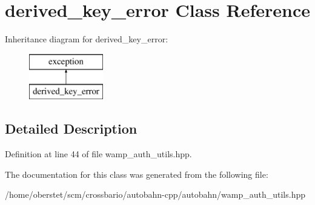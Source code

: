 \hypertarget{classderived__key__error}{}\section{derived\+\_\+key\+\_\+error Class Reference}
\label{classderived__key__error}
Inheritance diagram for derived\+\_\+key\+\_\+error\+:\begin{figure}[H]
\begin{center}
\leavevmode
\includegraphics[height=2.000000cm]{classderived__key__error}
\end{center}
\end{figure}


\subsection{Detailed Description}


Definition at line 44 of file wamp\+\_\+auth\+\_\+utils.\+hpp.



The documentation for this class was generated from the following file\+:\begin{DoxyCompactItemize}
\item 
/home/oberstet/scm/crossbario/autobahn-\/cpp/autobahn/wamp\+\_\+auth\+\_\+utils.\+hpp\end{DoxyCompactItemize}
